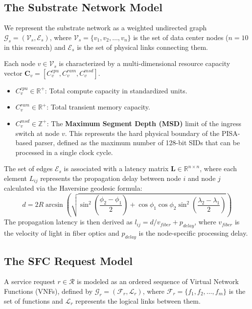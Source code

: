 \documentclass[12pt, a4paper, reqno, oneside]{book}
\begin{document}
\subsection{The Substrate Network Model}
We represent the substrate network as a weighted undirected graph $\mathcal{G}_s = (\mathcal{V}_s, \mathcal{E}_s)$, where $\mathcal{V}_s = \{v_1, v_2, \dots, v_n\}$ is the set of data center nodes ($n=10$ in this research) and $\mathcal{E}_s$ is the set of physical links connecting them. 

Each node $v \in \mathcal{V}_s$ is characterized by a multi-dimensional resource capacity vector $\mathbf{C}_v = [C_v^{cpu}, C_v^{ram}, C_v^{msd}]$. 
\begin{itemize}
    \item $C_v^{cpu} \in \mathbb{R}^+$: Total compute capacity in standardized units.
    \item $C_v^{ram} \in \mathbb{R}^+$: Total transient memory capacity.
    \item $C_v^{msd} \in \mathbb{Z}^+$: The \textbf{Maximum Segment Depth (MSD)} limit of the ingress switch at node $v$. This represents the hard physical boundary of the PISA-based parser, defined as the maximum number of 128-bit SIDs that can be processed in a single clock cycle.
\end{itemize}

The set of edges $\mathcal{E}_s$ is associated with a latency matrix $\mathbf{L} \in \mathbb{R}^{n \times n}$, where each element $L_{ij}$ represents the propagation delay between node $i$ and node $j$ calculated via the Haversine geodesic formula:
\begin{equation}
d = 2R \arcsin \left( \sqrt{\sin^2 \left( \frac{\phi_2 - \phi_1}{2} \right) + \cos \phi_1 \cos \phi_2 \sin^2 \left( \frac{\lambda_2 - \lambda_1}{2} \right)} \right)
\end{equation}
The propagation latency is then derived as $l_{ij} = d/v_{fiber} + p_{delay}$, where $v_{fiber}$ is the velocity of light in fiber optics and $p_{delay}$ is the node-specific processing delay.

\subsection{The SFC Request Model}
A service request $r \in \mathcal{R}$ is modeled as an ordered sequence of Virtual Network Functions (VNFs), defined by $\mathcal{G}_r = (\mathcal{F}_r, \mathcal{L}_r)$, where $\mathcal{F}_r = \{f_1, f_2, \dots, f_m\}$ is the set of functions and $\mathcal{L}_r$ represents the logical links between them.
\end{document}
